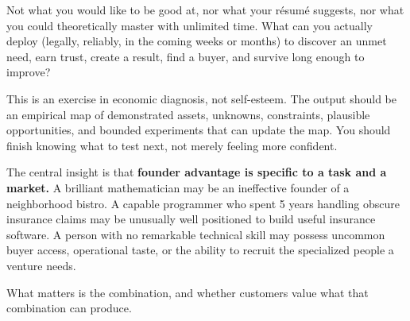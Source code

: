 Not what you would like to be good at, nor what your résumé suggests, nor what you could theoretically master with unlimited time. What can you actually deploy (legally, reliably, in the coming weeks or months) to discover an unmet need, earn trust, create a result, find a buyer, and survive long enough to improve?

This is an exercise in economic diagnosis, not self-esteem. The output should be an empirical map of demonstrated assets, unknowns, constraints, plausible opportunities, and bounded experiments that can update the map. You should finish knowing what to test next, not merely feeling more confident.

The central insight is that \textbf{founder advantage is specific to a task and a market.} A brilliant mathematician may be an ineffective founder of a neighborhood bistro. A capable programmer who spent 5 years handling obscure insurance claims may be unusually well positioned to build useful insurance software. A person with no remarkable technical skill may possess uncommon buyer access, operational taste, or the ability to recruit the specialized people a venture needs.

What matters is the combination, and whether customers value what that combination can produce.
